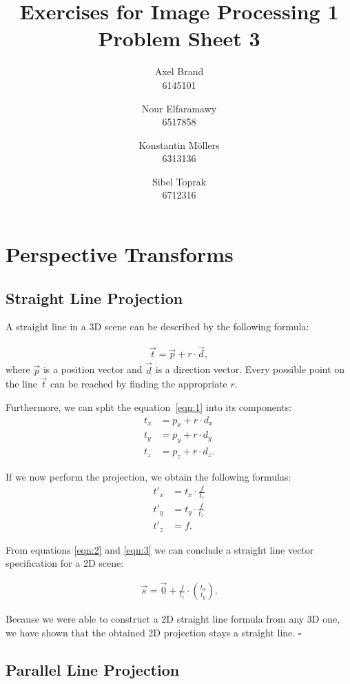 \documentclass[a4paper,12pt]{article}
\title{\textbf{Exercises for Image Processing 1}\\Problem Sheet 3}
\author{Axel Brand\\6145101 \and Nour Elfaramawy\\6517858 \and Konstantin M\"ollers\\6313136 \and Sibel Toprak\\6712316}
\begin{document}
	\maketitle
	
	\section{Perspective Transforms}
	
	\subsection{Straight Line Projection}
	
	A straight line in a 3D scene can be described by the following formula:
	
	\begin{align}\label{eqn:1} \vec{t} = \vec{p} + r \cdot \vec{d},\end{align}
	where $\vec{p}$ is a position vector and $\vec{d}$ is a direction vector. Every possible point on the line $\vec{t}$ can be reached by finding the appropriate $r$.
	
	Furthermore, we can split the equation~\ref{eqn:1} into its components:
	\begin{align}
		t_x &= p_x + r \cdot d_x \\
		t_y &= p_y + r \cdot d_y \\
		t_z &= p_z + r \cdot d_z.
	\end{align}
	
	If we now perform the projection, we obtain the following formulas:
	\begin{align}
		\label{eqn:2} t'_{x} &= t_x \cdot \frac{f}{t_z} \\
		\label{eqn:3}t'_{y} &= t_y \cdot \frac{f}{t_z}\\
		t'_{z} &= f.
	\end{align}
	
	From equations \ref{eqn:2} and \ref{eqn:3} we can conclude a straight line vector specification for a 2D scene:
	
	\begin{align}\label{eqn:4} \vec{s} = \vec{0} + \frac{f}{t_z} \cdot \binom{t_x}{t_y}.\end{align}
	
	Because we were able to construct a 2D straight line formula from any 3D one, we have shown that the obtained 2D projection stays a straight line. $\square$
	
	\subsection{Parallel Line Projection}
	
\end{document}
